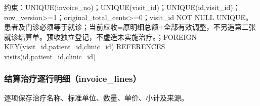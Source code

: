 \documentclass[UTF8,12pt,a4paper,fontset=none]{ctexart}
\begin{document}
约束：UNIQUE(\allowbreak{}invoice\_\allowbreak{}no)\allowbreak{}；UNIQUE(\allowbreak{}visit\_\allowbreak{}id)\allowbreak{}；UNIQUE(\allowbreak{}id,\allowbreak{}visit\_\allowbreak{}id)\allowbreak{}；row\_\allowbreak{}version>\allowbreak{}=\allowbreak{}1；original\_\allowbreak{}total\_\allowbreak{}cents>\allowbreak{}=\allowbreak{}0；visit\_\allowbreak{}id NOT NULL UNIQUE。患者及门诊必须等于就诊；当前应收=\allowbreak{}原明细总额+\allowbreak{}全部有效调整，不另造第二张就诊结算单。预收独立登记，不虚造未实施治疗。；FOREIGN KEY(\allowbreak{}visit\_\allowbreak{}id,\allowbreak{}patient\_\allowbreak{}id,\allowbreak{}clinic\_\allowbreak{}id)\allowbreak{} REFERENCES visits(\allowbreak{}id,\allowbreak{}patient\_\allowbreak{}id,\allowbreak{}clinic\_\allowbreak{}id)\allowbreak{}\par
\Needspace{604pt}
\subsubsection{结算治疗逐行明细（invoice\_lines）}
逐项保存治疗名称、标准单位、数量、单价、小计及来源。\par
\end{document}

